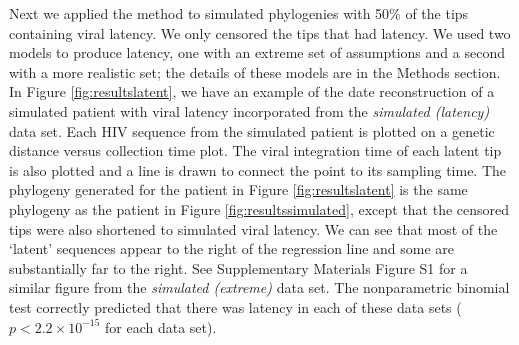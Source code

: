 \documentclass[12pt]{article}
\begin{document}





Next we applied the method to simulated phylogenies with 50\% of the tips containing viral latency.
We only censored the tips that had latency.
We used two models to produce latency, one with an extreme set of assumptions and a second with a more realistic set; the details of these models are in the Methods section.
In Figure \ref{fig:resultslatent}, we have an example of the date reconstruction of a simulated patient with viral latency incorporated from the \emph{simulated (latency)} data set.
Each HIV sequence from the simulated patient is plotted on a genetic distance versus collection time plot.
The viral integration time of each latent tip is also plotted and a line is drawn to connect the point to its sampling time.
The phylogeny generated for the patient in Figure \ref{fig:resultslatent} is the same phylogeny as the patient in Figure \ref{fig:resultssimulated}, except that the censored tips were also shortened to simulated viral latency.
We can see that most of the `latent' sequences appear to the right of the regression line and some are substantially far to the right.
See Supplementary Materials Figure S1 for a similar figure from the \emph{simulated (extreme)} data set.
The nonparametric binomial test correctly predicted that there was latency in each of these data sets ($p < 2.2 \times 10^{-15}$ for each data set).
\end{document}
